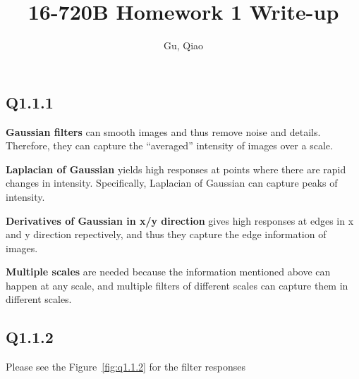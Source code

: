 \documentclass[11pt]{article}
\begin{document}
\author{Gu, Qiao}
\title{16-720B Homework 1 Write-up}
\maketitle

\medskip

\subsection*{Q1.1.1}

\textbf{Gaussian filters} can smooth images and thus remove noise and details. Therefore, they can capture the ``averaged'' intensity of images over a scale.

\textbf{Laplacian of Gaussian} yields high responses at points where there are rapid changes in intensity. Specifically, Laplacian of Gaussian can capture peaks of intensity.

\textbf{Derivatives of Gaussian in x/y direction} gives high responses at edges in x and y direction repectively, and thus they capture the edge information of images.

\textbf{Multiple scales} are needed because the information mentioned above can happen at any scale, and multiple filters of different scales can capture them in different scales.

\newpage

\subsection*{Q1.1.2}

Please see the Figure~\ref{fig:q1.1.2} for the filter responses
\end{document}
